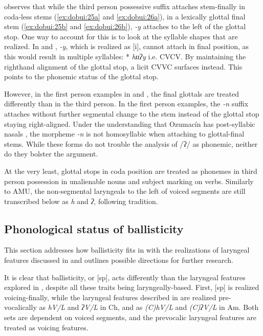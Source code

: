 \documentclass[output=paper]{langscibook}
\begin{document}
\citet[236]{Rupp2012} observes that while the third person possessive suffix attaches stem-finally in coda-less stems (\ref{ex:dobui:25a} and \ref{ex:dobui:26a}), in a lexically glottal final stem (\ref{ex:dobui:25b} and \ref{ex:dobui:26b}), \textit{-y} attaches to the left of the glottal stop. One way to account for this is to look at the syllable shapes that are realized. In  and , \textit{-y}, which is realized as [i], cannot attach in final position, as this would result in multiple syllables: * \textit{hɪɪʔy} i.e. CVCV. By maintaining the righthand alignment of the glottal stop, a licit CVVC surfaces instead. This points to the phonemic status of the glottal stop.

However, in the first person examples in  and , the final glottals are treated differently than in the third person. In the first person examples, the \textit{-n} suffix attaches without further segmental change to the stem instead of the glottal stop staying right-aligned. Under the understanding that Ozumacín has post-syllabic nasals \citep[30]{Rensch1968}, the morpheme \textit{-n} is not homosyllabic when attaching to glottal-final stems. While these forms do not trouble the analysis of /ʔ/ as phonemic, neither do they bolster the argument.

At the very least, glottal stops in coda position are treated as phonemes in third person possession in unalienable nouns and subject marking on verbs. Similarly to AMU, the non-segmental laryngeals to the left of voiced segments are still transcribed below as \textit{h} and \textit{ʔ}, following tradition. 

\subsection{Phonological status of ballisticity}

This section addresses how ballisticity fits in with the realizations of laryngeal features discussed in  and outlines possible directions for further research.

It is clear that ballisticity, or [sp], acts differently than the laryngeal features explored in , despite all these traits being laryngeally-based. First, [sp] is realized voicing-finally, while the laryngeal features described in  are realized pre-vocalically as \textit{hV/L} and \textit{ʔV/L} in Ch, and as \textit{(C)hV/L} and \textit{(C)ʔV/L} in Am. Both sets are dependent on voiced segments, and the prevocalic laryngeal features are treated as voicing features.
\end{document}
